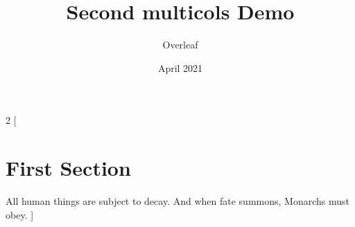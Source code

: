 \documentclass{article}
\title{Second multicols Demo}
\author{Overleaf}
\date{April 2021}
\begin{document}
	\maketitle
	
	\begin{multicols}{2}
		[
		\section{First Section}
		All human things are subject to decay. And when fate summons, Monarchs must obey.
		]
		\blindtext\blindtext
	\end{multicols}
	
\end{document}
